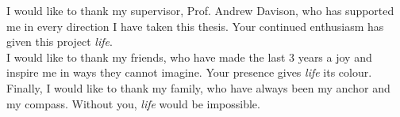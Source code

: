 I would like to thank my supervisor, Prof. Andrew Davison, who has supported me in every direction I have taken this thesis. Your continued enthusiasm has given this project \textit{life}.\\

I would like to thank my friends, who have made the last 3 years a joy and inspire me in ways they cannot imagine. Your presence gives \textit{life} its colour.\\

Finally, I would like to thank my family, who have always been my anchor and my compass. Without you, \textit{life} would be impossible.